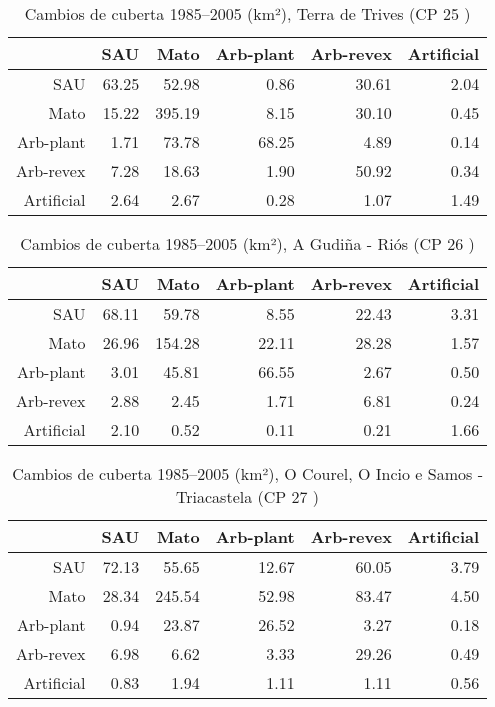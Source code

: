 \begin{table}[p]
\centering
\caption{Cambios de cuberta 1985--2005 (km²), Terra de Trives (CP 25 )} 
\label{TaboaContinxCP25}
\begin{tabular}{rrrrrr}
  \hline
 & SAU & Mato & Arb-plant & Arb-revex & Artificial \\ 
  \hline
SAU & 63.25 & 52.98 & 0.86 & 30.61 & 2.04 \\ 
  Mato & 15.22 & 395.19 & 8.15 & 30.10 & 0.45 \\ 
  Arb-plant & 1.71 & 73.78 & 68.25 & 4.89 & 0.14 \\ 
  Arb-revex & 7.28 & 18.63 & 1.90 & 50.92 & 0.34 \\ 
  Artificial & 2.64 & 2.67 & 0.28 & 1.07 & 1.49 \\ 
   \hline
\end{tabular}
\end{table}
\begin{table}[p]
\centering
\caption{Cambios de cuberta 1985--2005 (km²), A Gudiña - Riós (CP 26 )} 
\label{TaboaContinxCP26}
\begin{tabular}{rrrrrr}
  \hline
 & SAU & Mato & Arb-plant & Arb-revex & Artificial \\ 
  \hline
SAU & 68.11 & 59.78 & 8.55 & 22.43 & 3.31 \\ 
  Mato & 26.96 & 154.28 & 22.11 & 28.28 & 1.57 \\ 
  Arb-plant & 3.01 & 45.81 & 66.55 & 2.67 & 0.50 \\ 
  Arb-revex & 2.88 & 2.45 & 1.71 & 6.81 & 0.24 \\ 
  Artificial & 2.10 & 0.52 & 0.11 & 0.21 & 1.66 \\ 
   \hline
\end{tabular}
\end{table}
\begin{table}[p]
\centering
\caption{Cambios de cuberta 1985--2005 (km²), O Courel, O Incio e Samos - Triacastela (CP 27 )} 
\label{TaboaContinxCP27}
\begin{tabular}{rrrrrr}
  \hline
 & SAU & Mato & Arb-plant & Arb-revex & Artificial \\ 
  \hline
SAU & 72.13 & 55.65 & 12.67 & 60.05 & 3.79 \\ 
  Mato & 28.34 & 245.54 & 52.98 & 83.47 & 4.50 \\ 
  Arb-plant & 0.94 & 23.87 & 26.52 & 3.27 & 0.18 \\ 
  Arb-revex & 6.98 & 6.62 & 3.33 & 29.26 & 0.49 \\ 
  Artificial & 0.83 & 1.94 & 1.11 & 1.11 & 0.56 \\ 
   \hline
\end{tabular}
\end{table}
